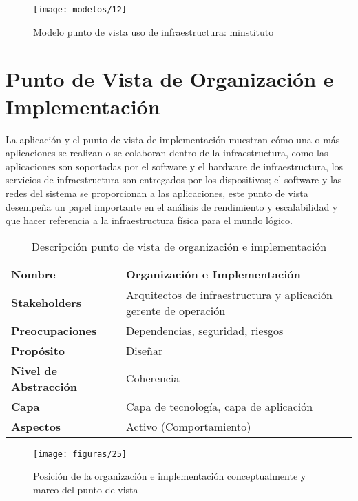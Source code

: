   \begin{figure}[H]
  	\centering
  	\texttt{[image: modelos/12]}
  	\captionsetup{width=.95\textwidth}
  	\caption{Modelo punto de vista uso de infraestructura: minstituto}
  	\label{modelo12}
  \end{figure}
  
  \section{Punto de Vista de Organización e Implementación}
  La aplicación y el punto de vista de implementación muestran cómo una o más aplicaciones se realizan o se colaboran dentro de la infraestructura, como las aplicaciones son soportadas por el software y el hardware de infraestructura, los servicios de infraestructura son entregados por los dispositivos; el software y las redes del sistema se proporcionan a las aplicaciones, este punto de vista desempeña un papel importante en el análisis de rendimiento y escalabilidad y que hacer referencia a la infraestructura física para el mundo
  lógico.
  
  \begin{table}[H]
  	\centering
  	\begin{tabular}{p{3.7cm}p{8cm}}
  		\hline
  		\rowcolor[HTML]{0073a1}
  		{\color[HTML]{FFFFFF} \textbf{Nombre}} & {\color[HTML]{FFFFFF} \textbf{Organización e Implementación}} \\
  		\hline
  		\textbf{Stakeholders} & Arquitectos de infraestructura y aplicación gerente de operación \\
  		\textbf{Preocupaciones} & Dependencias, seguridad, riesgos \\
  		\textbf{Propósito} & Diseñar \\
  		\textbf{Nivel de Abstracción} & Coherencia \\
  		\textbf{Capa} & Capa de tecnología, capa de aplicación \\
  		\textbf{Aspectos} & Activo (Comportamiento) \\
  		\bottomrule
  	\end{tabular}
  	\captionsetup{width=.95\textwidth}
  	\caption{Descripción punto de vista de organización e implementación}
  	\label{tabla16}
  \end{table}
  
  \begin{figure}[H]
  	\centering
  	\texttt{[image: figuras/25]}
  	\captionsetup{width=.95\textwidth}
  	\caption{Posición de la organización e implementación conceptualmente y marco del punto de vista}
  	\label{figura25}
  \end{figure}
  
